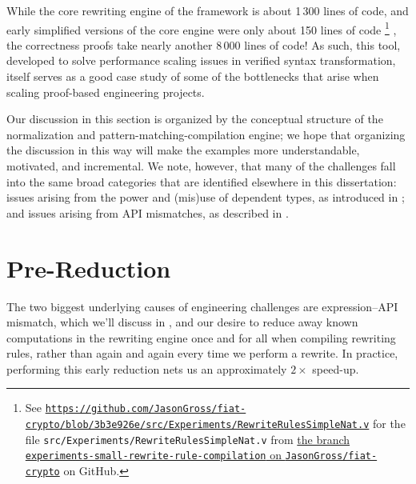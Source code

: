 While the core rewriting engine of the framework is about 1\,300 lines of code, and early simplified versions of the core engine were only about 150 lines of code%
\bgroup
\allowbreakafterslash
\footnote{%
  See \href{https://web.archive.org/web/20200716002534/https://github.com/JasonGross/fiat-crypto/blob/3b3e926e4186caa1a4003c81c65dad0a1c04b43d/src/Experiments/RewriteRulesSimpleNat.v}{\texttt{https://github.com/JasonGross/fiat-crypto/blob/3b3e926e/src/Experiments/RewriteRulesSimpleNat.v}} for the file \texttt{src/Experiments/RewriteRulesSimpleNat.v} from \href{https://github.com/JasonGross/fiat-crypto/tree/experiments-small-rewrite-rule-compilation}{the branch \texttt{experiments-small-rewrite-rule-compilation} on \texttt{JasonGross/fiat-crypto}} on GitHub.%
}%
\egroup
, the correctness proofs take nearly another 8\,000 lines of code!
As such, this tool, developed to solve performance scaling issues in verified syntax transformation, itself serves as a good case study of some of the bottlenecks that arise when scaling proof-based engineering projects.

Our discussion in this section is organized by the conceptual structure of the normalization and pattern-matching-compilation engine;
we hope that organizing the discussion in this way will make the examples more understandable, motivated, and incremental.
We note, however, that many of the challenges fall into the same broad categories that are identified elsewhere in this dissertation:
issues arising from the power and (mis)use of dependent types, as introduced in ;
and issues arising from API mismatches, as described in .

\section{Pre-Reduction}\label{sec:rewriting-more:prereduction}
The two biggest underlying causes of engineering challenges are expression--API mismatch, which we'll discuss in , and our desire to reduce away known computations in the rewriting engine once and for all when compiling rewriting rules, rather than again and again every time we perform a rewrite.
In practice, performing this early reduction nets us an approximately $2\times$ speed-up.

